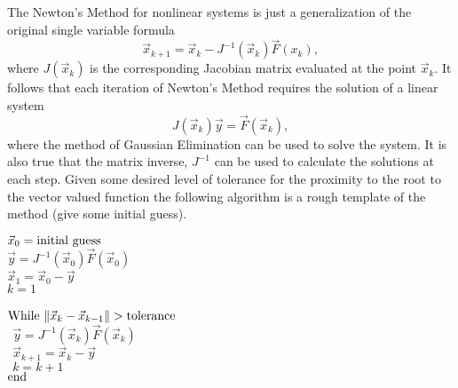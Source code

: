 \documentclass[twoside]{article}
\def\ds{\displaystyle}
\begin{document}
The Newton's Method for nonlinear systems is just a generalization of the original single variable formula
$$\vec x_{k+1} = \vec x_k - J^{-1}(\vec x_k)\vec F (x_k),$$
where $\ds J(\vec x_k)$ is the corresponding Jacobian matrix evaluated at the point $\ds \vec x_k$. It follows that each iteration of Newton's Method requires the solution of a linear system
$$J(\vec x_k) \vec y = \vec F(\vec x_k),$$
where the method of Gaussian Elimination can be used to solve the system. It is also true that the matrix inverse, $\ds J^{-1}$ can be used to calculate the solutions at each step. Given some desired level of tolerance for the proximity to the root to the vector valued function the following algorithm is a rough template of the method (give some initial guess).

$\vec x_0 = {\rm initial \ guess}$\\
$ \vec y = J^{-1}(\vec x_0)\vec F(\vec x_0)$ \\
$\vec x_1 = \vec x_0 - \vec y$ \\
$ k = 1$\\
 \\
$ {\rm While} \ \Vert \vec x_{k} - \vec x_{k-1} \Vert > {\rm tolerance}$ \\
$ \ \ \vec y = J^{-1}(\vec x_k)\vec F(\vec x_k)$ \\
$ \ \ \vec x_{k+1} = \vec x_k - \vec y$ \\
$ \ \ k = k+1$ \\
$ {\rm end}$
\end{document}
